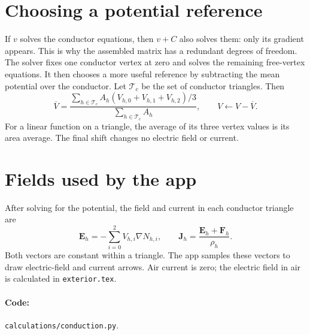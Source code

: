 \documentclass[11pt]{article}
\begin{document}
\section{Choosing a potential reference}
If $v$ solves the conductor equations, then $v+C$ also solves them:
only its gradient appears. This is why the assembled matrix has
a redundant degrees of freedom.
The solver fixes one conductor vertex at zero
and solves the remaining free-vertex equations. It then chooses a more
useful reference by subtracting the mean potential over the conductor.
Let $\mathcal T_c$ be the set of conductor triangles. Then
\begin{equation}
 \overline V=
 \frac{\displaystyle\sum_{h\in\mathcal T_c}
       A_h(V_{h,0}+V_{h,1}+V_{h,2})/3}
      {\displaystyle\sum_{h\in\mathcal T_c}A_h},
 \qquad V\leftarrow V-\overline V.
\end{equation}
For a linear function on a triangle, the average of its three vertex
values is its area average. The final shift changes no electric field
or current.

\section{Fields used by the app}
After solving for the potential, the field and current in each
conductor triangle are
\begin{equation}
 \bm E_h=-\sum_{i=0}^2 V_{h,i}\nabla N_{h,i},\qquad
 \bm J_h=\frac{\bm E_h+\bm F_h}{\rho_h}.
\end{equation}
Both vectors are constant within a triangle. The app samples these
vectors to draw electric-field and current arrows. Air current is zero;
the electric field in air is calculated in \texttt{exterior.tex}.

\paragraph{Code:} \texttt{calculations/conduction.py}.
\end{document}
